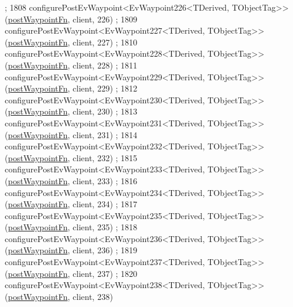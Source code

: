 \begin{DoxyCode}
      ;
1808     configurePostEvWaypoint<EvWaypoint226<TDerived, TObjectTag>>(\hyperlink{classmove__base__z__client_1_1WaypointEventDispatcher_acc538eb7506c13f7cca2268a1742dadd}{postWaypointFn}, client, 226)
      ;
1809     configurePostEvWaypoint<EvWaypoint227<TDerived, TObjectTag>>(\hyperlink{classmove__base__z__client_1_1WaypointEventDispatcher_acc538eb7506c13f7cca2268a1742dadd}{postWaypointFn}, client, 227)
      ;
1810     configurePostEvWaypoint<EvWaypoint228<TDerived, TObjectTag>>(\hyperlink{classmove__base__z__client_1_1WaypointEventDispatcher_acc538eb7506c13f7cca2268a1742dadd}{postWaypointFn}, client, 228)
      ;
1811     configurePostEvWaypoint<EvWaypoint229<TDerived, TObjectTag>>(\hyperlink{classmove__base__z__client_1_1WaypointEventDispatcher_acc538eb7506c13f7cca2268a1742dadd}{postWaypointFn}, client, 229)
      ;
1812     configurePostEvWaypoint<EvWaypoint230<TDerived, TObjectTag>>(\hyperlink{classmove__base__z__client_1_1WaypointEventDispatcher_acc538eb7506c13f7cca2268a1742dadd}{postWaypointFn}, client, 230)
      ;
1813     configurePostEvWaypoint<EvWaypoint231<TDerived, TObjectTag>>(\hyperlink{classmove__base__z__client_1_1WaypointEventDispatcher_acc538eb7506c13f7cca2268a1742dadd}{postWaypointFn}, client, 231)
      ;
1814     configurePostEvWaypoint<EvWaypoint232<TDerived, TObjectTag>>(\hyperlink{classmove__base__z__client_1_1WaypointEventDispatcher_acc538eb7506c13f7cca2268a1742dadd}{postWaypointFn}, client, 232)
      ;
1815     configurePostEvWaypoint<EvWaypoint233<TDerived, TObjectTag>>(\hyperlink{classmove__base__z__client_1_1WaypointEventDispatcher_acc538eb7506c13f7cca2268a1742dadd}{postWaypointFn}, client, 233)
      ;
1816     configurePostEvWaypoint<EvWaypoint234<TDerived, TObjectTag>>(\hyperlink{classmove__base__z__client_1_1WaypointEventDispatcher_acc538eb7506c13f7cca2268a1742dadd}{postWaypointFn}, client, 234)
      ;
1817     configurePostEvWaypoint<EvWaypoint235<TDerived, TObjectTag>>(\hyperlink{classmove__base__z__client_1_1WaypointEventDispatcher_acc538eb7506c13f7cca2268a1742dadd}{postWaypointFn}, client, 235)
      ;
1818     configurePostEvWaypoint<EvWaypoint236<TDerived, TObjectTag>>(\hyperlink{classmove__base__z__client_1_1WaypointEventDispatcher_acc538eb7506c13f7cca2268a1742dadd}{postWaypointFn}, client, 236)
      ;
1819     configurePostEvWaypoint<EvWaypoint237<TDerived, TObjectTag>>(\hyperlink{classmove__base__z__client_1_1WaypointEventDispatcher_acc538eb7506c13f7cca2268a1742dadd}{postWaypointFn}, client, 237)
      ;
1820     configurePostEvWaypoint<EvWaypoint238<TDerived, TObjectTag>>(\hyperlink{classmove__base__z__client_1_1WaypointEventDispatcher_acc538eb7506c13f7cca2268a1742dadd}{postWaypointFn}, client, 238)

\end{DoxyCode}
